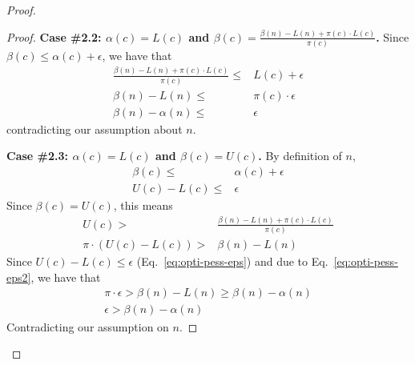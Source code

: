 \documentclass[letterpaper]{article} %
\newcommand{\pess}{\mathit{L}}
\newcommand{\opti}{\mathit{U}}
\begin{document}
\begin{proof}
\begin{proof}
{\bf Case \#2.2: $\alpha(c)=\pess(c)$ 
	and $\beta(c)=\frac{\beta(n)-\pess(n)+\pi(c)\cdot\pess(c)}{\pi(c)}$.} 
Since $\beta(c)\leq \alpha(c)+\epsilon$, we have that
\begin{align}
\frac{\beta(n)-\pess(n)+\pi(c)\cdot\pess(c)}{\pi(c)} \leq & \pess(c)+\epsilon \\
\beta(n)-\pess(n) \leq & \pi(c)\cdot \epsilon \\
\beta(n)-\alpha(n) \leq & \epsilon 
\end{align}
contradicting our assumption about $n$. 

{\bf Case \#2.3: $\alpha(c)=\pess(c)$ and $\beta(c)=\opti(c)$.} 
By definition of $n$, 
\begin{align}
\beta(c)\leq & \alpha(c)+\epsilon\\
\opti(c)-\pess(c)\leq  & \epsilon \label{eq:opti-pess-eps}
\end{align}
Since $\beta(c)=\opti(c)$, this means 
\begin{align}
\opti(c)>& \frac{\beta(n)-\pess(n)+\pi(c)\cdot\pess(c)}{\pi(c)} \\
\pi\cdot(\opti(c)-\pess(c))>& \beta(n)-\pess(n) \label{eq:opti-pess-eps2}
\end{align}
Since $\opti(c)-\pess(c)\leq  \epsilon$ (Eq.~\ref{eq:opti-pess-eps}) and
due to Eq.~\ref{eq:opti-pess-eps2}, we have that 
\begin{align}
\pi\cdot\epsilon > \beta(n)-\pess(n) \geq \beta(n)-\alpha(n) \\
\epsilon > \beta(n)-\alpha(n) 
\end{align}
Contradicting our assumption on $n$. 


\end{proof}
\end{proof}
\end{document}
